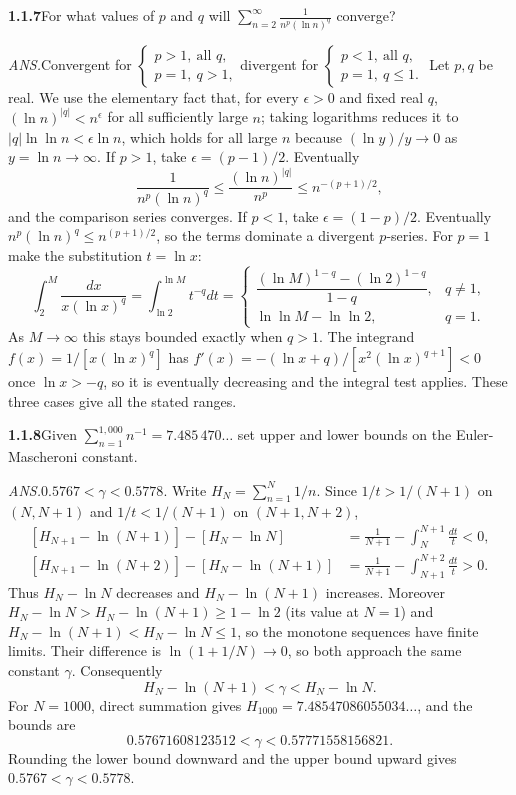 \par\bigskip
\noindent\textbf{1.1.7}\quad For what values of $p$ and $q$ will
$\displaystyle\sum_{n=2}^{\infty}\frac{1}{n^{p}(\ln n)^{q}}$ converge?
\par\nobreak\hfill\emph{ANS.}\enspace Convergent for
$\begin{cases}p>1,\ \text{all }q,\\ p=1,\ q>1,\end{cases}$\quad divergent for
$\begin{cases}p<1,\ \text{all }q,\\ p=1,\ q\leq1.\end{cases}$
\solution
Let $p,q$ be real. We use the elementary fact that, for every
$\epsilon>0$ and fixed real $q$, $(\ln n)^{|q|}<n^\epsilon$ for
all sufficiently large $n$; taking logarithms reduces it to
$|q|\ln\ln n<\epsilon\ln n$, which holds for all large $n$ because
$(\ln y)/y\to0$ as $y=\ln n\to\infty$.
If $p>1$, take $\epsilon=(p-1)/2$. Eventually
\[
 \frac1{n^p(\ln n)^q}\le\frac{(\ln n)^{|q|}}{n^p}
 \le n^{-(p+1)/2},
\]
and the comparison series converges. If $p<1$, take
$\epsilon=(1-p)/2$. Eventually
$n^p(\ln n)^q\le n^{(p+1)/2}$, so the terms dominate a divergent
$p$-series. For $p=1$ make the substitution $t=\ln x$:
\[
 \int_2^M\frac{dx}{x(\ln x)^q}
  =\int_{\ln2}^{\ln M}t^{-q}dt
  =\begin{cases}
   \dfrac{(\ln M)^{1-q}-(\ln2)^{1-q}}{1-q}, & q\ne1,\\[1ex]
   \ln\ln M-\ln\ln2, & q=1.
   \end{cases}
\]
As $M\to\infty$ this stays bounded exactly when $q>1$.
The integrand $f(x)=1/[x(\ln x)^q]$ has
$f'(x)=-(\ln x+q)/[x^2(\ln x)^{q+1}]<0$ once $\ln x>-q$, so it is
eventually decreasing and the integral test applies. These three cases
give all the stated ranges.


\par\bigskip
\noindent\textbf{1.1.8}\quad Given $\sum_{n=1}^{1{,}000}n^{-1}=7.485\,470\ldots$
set upper and lower bounds on the Euler-Mascheroni constant.
\par\nobreak\hfill\emph{ANS.}\enspace $0.5767<\gamma<0.5778$.
\solution
Write $H_N=\sum_{n=1}^N1/n$. Since $1/t>1/(N+1)$ on $(N,N+1)$ and
$1/t<1/(N+1)$ on $(N+1,N+2)$,
\[
 \begin{aligned}
 [H_{N+1}-\ln(N+1)]-[H_N-\ln N]
  &=\frac1{N+1}-\int_N^{N+1}\frac{dt}t<0,\\
 [H_{N+1}-\ln(N+2)]-[H_N-\ln(N+1)]
  &=\frac1{N+1}-\int_{N+1}^{N+2}\frac{dt}t>0.
 \end{aligned}
\]
Thus $H_N-\ln N$ decreases and $H_N-\ln(N+1)$ increases. Moreover
$H_N-\ln N>H_N-\ln(N+1)\ge1-\ln2$ (its value at $N=1$) and
$H_N-\ln(N+1)<H_N-\ln N\le1$, so the monotone sequences have finite
limits. Their difference is $\ln(1+1/N)\to0$,
so both approach the same constant $\gamma$. Consequently
\[
 H_N-\ln(N+1)<\gamma<H_N-\ln N.
\]
For $N=1000$, direct summation gives $H_{1000}=7.48547086055034\ldots$,
and the bounds are
\[
 0.57671608123512<\gamma<0.57771558156821.
\]
Rounding the lower bound downward and the upper bound upward gives
$0.5767<\gamma<0.5778$.


